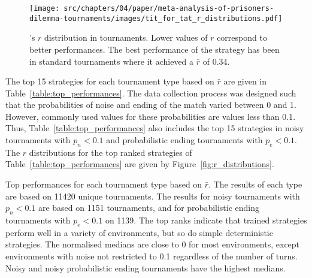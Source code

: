\begin{figure}[!htbp]
    \centering
    \texttt{[image: src/chapters/04/paper/meta-analysis-of-prisoners-dilemma-tournaments/images/tit\_for\_tat\_r\_distributions.pdf]}
    \caption{\TitForTat's $r$ distribution in tournaments. Lower values of \(r\)
    correspond to better performances. The best performance
    of the strategy has been in standard tournaments where it achieved a $\bar{r}$
    of 0.34.}
    \label{fig:tit_for_tat_r_distribution}
\end{figure}

The top 15 strategies for each tournament type based on \(\bar{r}\) are given in
Table~\ref{table:top_performances}. The data collection process was designed such
that the probabilities of noise and ending of the match varied between 0 and
1. However, commonly used values for these probabilities are values less than 0.1.
Thus,
Table~\ref{table:top_performances} also includes the top 15 strategies in noisy
tournaments with \(p_n < 0.1\) and probabilistic ending tournaments with \(p_e <
0.1\). The \(r\) distributions for the top ranked strategies of Table~\ref{table:top_performances}
are given by Figure~\ref{fig:r_distributions}.

\begin{table}[!htbp]
    \begin{center}
    \resizebox{\textwidth}{!}{
        
    }
\end{center}
\caption{Top performances for each tournament type based on $\bar{r}$. The
results of each type are based on 11420 unique tournaments. The
results for noisy tournaments with \(p_n < 0.1\) are based on 1151 tournaments,
and for probabilistic ending tournaments with \(p_e < 0.1\) on 1139. The top
ranks indicate that trained strategies perform well in a variety of
environments, but so do simple deterministic strategies. The normalised medians
are close to 0 for most environments, except environments with noise not
restricted to 0.1 regardless of the number of turns. Noisy and noisy probabilistic
ending tournaments have the highest medians.}
\label{table:top_performances}
\end{table}

